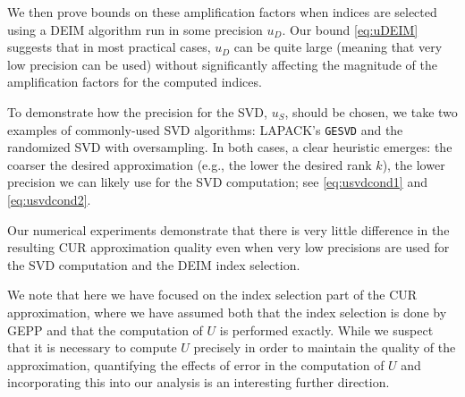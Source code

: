 \documentclass[12pt, a4paper]{article}
\theoremstyle{remark}
\begin{document}
We then prove bounds on these amplification factors when indices are selected using a DEIM algorithm run in some precision $u_{D}$. Our bound \eqref{eq:uDEIM} suggests that in most practical cases, $u_{D}$ can be quite large (meaning that very low precision can be used) without significantly affecting the magnitude of the amplification factors for the computed indices. 

To demonstrate how the precision for the SVD, $u_S$, should be chosen, we take two examples of commonly-used SVD algorithms: LAPACK's \texttt{GESVD} and the randomized SVD with oversampling. In both cases, a clear heuristic emerges: the coarser the desired approximation (e.g., the lower the desired rank $k$), the lower precision we can likely use for the SVD computation; see \eqref{eq:usvdcond1} and \eqref{eq:usvdcond2}.  

Our numerical experiments demonstrate that there is very little difference in the resulting CUR approximation quality even when very low precisions are used for the SVD computation and the DEIM index selection. 

We note that here we have focused on the index selection part of the CUR approximation, where we have assumed both that the index selection is done by GEPP and that the computation of $U$ is performed exactly. While we suspect that it is necessary to compute $U$ precisely in order to maintain the quality of the approximation, quantifying the effects of error in the computation of $U$ and incorporating this into our analysis is an interesting further direction. 







\end{document}
